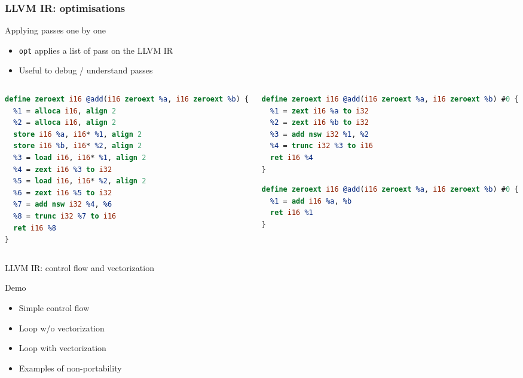 \begin{frame}[fragile]
  \frametitle{LLVM IR: optimisations}

  \begin{block}{Applying passes one by one}
    \begin{itemize}
      \item {\tt opt} applies a list of pass on the LLVM IR
      \item Useful to debug / understand passes
    \end{itemize}
  \end{block}

  \vspace{-1em}
  \begin{columns}[t]
    \begin{column}{0.5\textwidth}
      \begin{lstlisting}[caption=Non-optimized IR,language=llvm,frame=leftline]
define zeroext i16 @add(i16 zeroext %a, i16 zeroext %b) {
  %1 = alloca i16, align 2
  %2 = alloca i16, align 2
  store i16 %a, i16* %1, align 2
  store i16 %b, i16* %2, align 2
  %3 = load i16, i16* %1, align 2
  %4 = zext i16 %3 to i32
  %5 = load i16, i16* %2, align 2
  %6 = zext i16 %5 to i32
  %7 = add nsw i32 %4, %6
  %8 = trunc i32 %7 to i16
  ret i16 %8
}
      \end{lstlisting}
    \end{column}
    \begin{column}{0.5\textwidth}
      \begin{lstlisting}[caption={\tt opt -mem2reg -S},language=llvm,frame=leftline]
define zeroext i16 @add(i16 zeroext %a, i16 zeroext %b) #0 {
  %1 = zext i16 %a to i32
  %2 = zext i16 %b to i32
  %3 = add nsw i32 %1, %2
  %4 = trunc i32 %3 to i16
  ret i16 %4
}
      \end{lstlisting}
      \vspace{-1em}
      \pause
      \begin{lstlisting}[caption={\tt opt -mem2reg -instcombine -S},language=llvm,frame=leftline]
define zeroext i16 @add(i16 zeroext %a, i16 zeroext %b) #0 {
  %1 = add i16 %a, %b
  ret i16 %1
}
      \end{lstlisting}
    \end{column}
  \end{columns}

\end{frame}

\begin{frame}{LLVM IR: control flow and vectorization}
  \begin{block}{Demo}
    \begin{itemize}
      \item Simple control flow
      \item Loop w/o vectorization
      \item Loop with vectorization
      \item Examples of non-portability
    \end{itemize}
  \end{block}

\end{frame}

